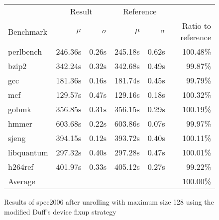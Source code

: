 \begin{figure}[bh]
    \begin{center}
        \begin{tabular}{lrrrrr}
            \toprule
            & \multicolumn{2}{c}{Result} & \multicolumn{2}{c}{Reference}\\
            Benchmark & $\mu$ & $\sigma$ & $\mu$ & $\sigma$ & Ratio to reference\\
            \midrule
            perlbench & 246.36s & 0.26s & 245.18s & 0.62s & 100.48\%\\
            bzip2 & 342.24s & 0.32s & 342.68s & 0.49s & 99.87\%\\
            gcc & 181.36s & 0.16s & 181.74s & 0.45s & 99.79\%\\
            mcf & 129.57s & 0.47s & 129.16s & 0.18s & 100.32\%\\
            gobmk & 356.85s & 0.31s & 356.15s & 0.29s & 100.19\%\\
            hmmer & 603.68s & 0.22s & 603.86s & 0.07s & 99.97\%\\
            sjeng & 394.15s & 0.12s & 393.72s & 0.40s & 100.11\%\\
            libquantum & 297.32s & 0.40s & 297.28s & 0.47s & 100.01\%\\
            h264ref & 401.97s & 0.33s & 405.12s & 0.27s & 99.22\%\\
            \midrule
            Average & & & & & 100.00\%\\
            \bottomrule
        \end{tabular}
    \end{center}
    \caption{Results of spec2006 after unrolling with maximum size 128 using the modified Duff's device fixup strategy}
    \label{fig:eval:perf:duff:128}
\end{figure}
